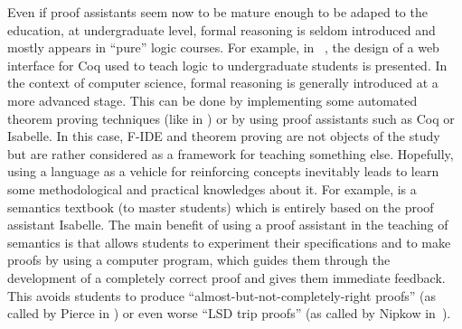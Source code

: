 \documentclass[submission,copyright,creativecommons]{eptcs}
\begin{document}
Even if proof assistants seem now to be mature enough to be adaped to the education,
at undergraduate level, formal reasoning is seldom introduced and
mostly appears in ``pure'' logic courses. For example, 
in~ \cite{hendriks-adn10}, the design of a web interface for Coq used to teach
logic to undergraduate students is presented. 
In the context of computer science, formal reasoning is generally introduced at
a more advanced stage. This can be done by implementing some automated
theorem proving techniques (like in \cite{Harrison09}) or by using
proof assistants such as Coq or Isabelle.
In this case, F-IDE and theorem proving are not objects of the study but are
rather considered 
as a framework for teaching something else. Hopefully, using a language
as a vehicle for reinforcing concepts inevitably leads to learn some
methodological  and practical knowledges
about it.
For example, \cite{NKtoappear} is a semantics
textbook (to master students)  which is entirely based on the proof assistant
Isabelle.
The main benefit of using a proof assistant in
the teaching of semantics is that allows students to experiment their
specifications and to make
proofs by using a
computer program, which guides them through the development of
a completely correct proof and gives them immediate feedback.
This avoids 
students to produce ``almost-but-not-completely-right proofs'' (as
called by Pierce in \cite{DBLP:conf/icfp/Pierce09}) or even worse ``LSD trip proofs''
(as called by Nipkow in~\cite{Nipkow-VMCAI12}).
\end{document}
